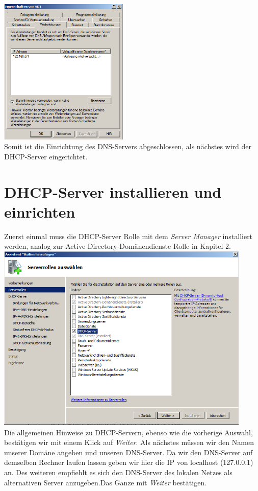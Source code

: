 \documentclass[12pt,a4paper,titlepage]{scrartcl} %
\begin{document}
	\includegraphics[height=7cm]{Bilder/038(DNS10)}\\

Somit ist die Einrichtung des DNS-Servers abgeschlossen, als nächstes wird der DHCP-Server eingerichtet.

\newpage
\section{DHCP-Server installieren und einrichten}
Zuerst einmal muss die DHCP-Server Rolle mit dem \emph{Server Manager} installiert werden, analog zur Active Directory-Domänendienste Rolle in Kapitel 2.\\

	\includegraphics[height=9cm]{Bilder/039(DHCP01)}\\

Die allgemeinen Hinweise zu DHCP-Servern, ebenso wie die vorherige Auswahl, bestätigen wir mit einem Klick auf \emph{Weiter}. Als nächstes müssen wir den Namen unserer Domäne angeben und unseren DNS-Server. Da wir den DNS-Server auf demselben Rechner laufen lassen geben wir hier die IP von localhost (127.0.0.1) an. Des weiteren empfiehlt es sich den DNS-Server des lokalen Netzes als alternativen Server anzugeben.Das Ganze mit \emph{Weiter} bestätigen.\\
\end{document}
